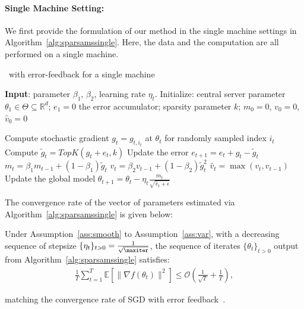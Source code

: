 \documentclass[11pt]{article}
\begin{document}
\paragraph{Single Machine Setting:}

We first provide the formulation of our method in the single machine settings in Algorithm~\ref{alg:sparsamssingle}.
Here, the data and the computation are all performed on a single machine.

\begin{algorithm}[H]
\caption{\algo\ with error-feedback for a single machine} \label{alg:sparsamssingle}
\begin{algorithmic}[1]

\STATE \textbf{Input}: parameter $\beta_1$, $\beta_2$, learning rate $\eta_t$. 
\STATE Initialize: central server parameter $\theta_{1} \in \Theta \subseteq \mathbb R^d$; $e_{1}=0$ the error accumulator; sparsity parameter $k$; $m_0=0$, $v_0=0$, $\hat v_0=0$

\STATE  Compute stochastic gradient $g_{t} = g_{t,i_t}$ at $\theta_t$ for randomly sampled index $i_t$\label{line:stochgrad} 
\STATE  Compute $\tilde g_{t}=TopK(g_{t}+e_{t},k)$ \label{line:topksingle} 
\STATE  Update the error $e_{t+1}=e_{t}+g_{t}-\tilde g_{t}$
\STATE $m_t=\beta_1 m_{t-1}+(1-\beta_1)\tilde g_t$
\STATE $v_t=\beta_2 v_{t-1}+(1-\beta_2)\tilde g_t^2$
\STATE $\hat v_t=\max(v_t,\hat v_{t-1})$ \label{line:vsingle}
\STATE Update the global model $\theta_{t+1}=\theta_{t}-\eta_t\frac{m_t}{\sqrt{\hat v_t+\epsilon}}$

\ENDFOR
\end{algorithmic}
\end{algorithm}


The convergence rate of the vector of parameters estimated via Algorithm~\ref{alg:sparsamssingle} is given below:
\begin{Theorem}\label{thm:mainsingle}
Under Assumption~\ref{ass:smooth} to Assumption~\ref{ass:var}, with a decreasing sequence of stepsize $\{\eta_t\}_{t>0} = \frac{1}{\sqrt{\maxiter}}$, the sequence of iterates $\{\theta_t\}_{t>0}$ output from Algorithm~\ref{alg:sparsamssingle} satisfies:
\begin{align*}
    \frac{1}{T}\sum_{t=1}^T \mathbb E[\|\nabla f(\theta_t)\|^2]\leq \mathcal O(\frac{1}{\sqrt T}+\frac{1}{T}),
\end{align*}

\end{Theorem}

matching the convergence rate of SGD with error feedback~\cite{karimireddy2019error}.
\end{document}

